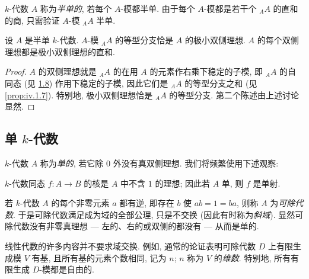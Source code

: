 $k$-代数 $A$ 称为\emph{半单的}, 若每个 $A$-模都半单. 由于每个 $A$-模都是若干个 ${}_A A$ 的直和的商, 只需验证 $A$-模 ${}_A A$ 半单.

\setcounter{theorem}{8} %

\begin{proposition}\label{prop:iv.1.9}
设 $A$ 是半单 $k$-代数. $A$-模 ${}_A A$ 的等型分支恰是 $A$ 的极小双侧理想. $A$ 的每个双侧理想都是极小双侧理想的直和.
\end{proposition}

\begin{proof}
$A$ 的双侧理想就是 ${}_A A$ 的在用 $A$ 的元素作右乘下稳定的子模, 即 ${}_A A$ 的自同态 (见 \hyperlink{item:iv.1.8}{1.8}) 作用下稳定的子模, 因此它们是 ${}_A A$ 的等型分支之和 (见 \ref{prop:iv.1.7}). 特别地, 极小双侧理想恰是 ${}_A A$ 的等型分支. 第二个陈述由上述讨论显然.
\end{proof}

\subsection*{单 $k$-代数}

$k$-代数 $A$ 称为\emph{单的}, 若它除 $0$ 外没有真双侧理想. 我们将频繁使用下述观察:

$k$-代数同态 $f\colon A\to B$ 的核是 $A$ 中不含 $1$ 的理想; 因此若 $A$ 单, 则 $f$ 是单射.

\begin{example}\label{ex:iv.1.10}
若 $k$-代数 $A$ 的每个非零元素 $a$ 都有逆, 即存在 $b$ 使 $ab=1=ba$, 则称 $A$ 为\emph{可除代数}. 于是可除代数满足成为域的全部公理, 只是不交换 (因此有时称为\emph{斜域}). 显然可除代数没有非零真理想 — 左的、右的或双侧的都没有 — 从而是单的.

线性代数的许多内容并不要求域交换. 例如, 通常的论证表明可除代数 $D$ 上有限生成模 $V$ 有基, 且所有基的元素个数相同, 记为 $n$; $n$ 称为 $V$ 的\emph{维数}. 特别地, 所有有限生成 $D$-模都是自由的.
\end{example}

